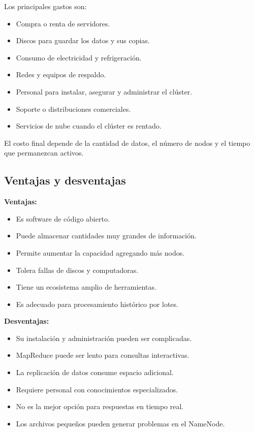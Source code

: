 Los principales gastos son:

\begin{itemize}
    \item Compra o renta de servidores.
    \item Discos para guardar los datos y sus copias.
    \item Consumo de electricidad y refrigeración.
    \item Redes y equipos de respaldo.
    \item Personal para instalar, asegurar y administrar el clúster.
    \item Soporte o distribuciones comerciales.
    \item Servicios de nube cuando el clúster es rentado.
\end{itemize}

El costo final depende de la cantidad de datos, el número de nodos y el tiempo
que permanezcan activos.

\subsection{Ventajas y desventajas}

\textbf{Ventajas:}

\begin{itemize}
    \item Es software de código abierto.
    \item Puede almacenar cantidades muy grandes de información.
    \item Permite aumentar la capacidad agregando más nodos.
    \item Tolera fallas de discos y computadoras.
    \item Tiene un ecosistema amplio de herramientas.
    \item Es adecuado para procesamiento histórico por lotes.
\end{itemize}

\textbf{Desventajas:}

\begin{itemize}
    \item Su instalación y administración pueden ser complicadas.
    \item MapReduce puede ser lento para consultas interactivas.
    \item La replicación de datos consume espacio adicional.
    \item Requiere personal con conocimientos especializados.
    \item No es la mejor opción para respuestas en tiempo real.
    \item Los archivos pequeños pueden generar problemas en el NameNode.
\end{itemize}

